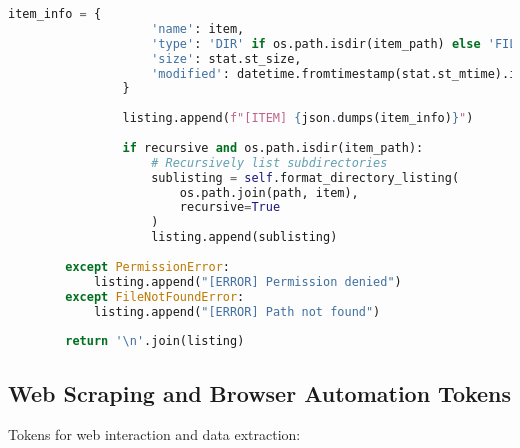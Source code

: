 \begin{lstlisting}[language=Python, caption=File system operation tokens]
                item_info = {
                    'name': item,
                    'type': 'DIR' if os.path.isdir(item_path) else 'FILE',
                    'size': stat.st_size,
                    'modified': datetime.fromtimestamp(stat.st_mtime).isoformat()
                }
                
                listing.append(f"[ITEM] {json.dumps(item_info)}")
                
                if recursive and os.path.isdir(item_path):
                    # Recursively list subdirectories
                    sublisting = self.format_directory_listing(
                        os.path.join(path, item),
                        recursive=True
                    )
                    listing.append(sublisting)
                    
        except PermissionError:
            listing.append("[ERROR] Permission denied")
        except FileNotFoundError:
            listing.append("[ERROR] Path not found")
        
        return '\n'.join(listing)
\end{lstlisting}

\subsection{Web Scraping and Browser Automation Tokens}

Tokens for web interaction and data extraction:

